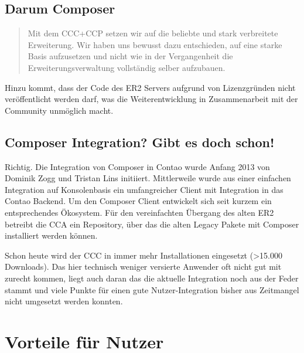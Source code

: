 \documentclass[
paper=a4,
draft=false,%
fontsize=10pt%
]{scrartcl}
\begin{document}
\subsection{Darum Composer}

\begin{quotation}
Mit dem CCC+CCP setzen wir auf die beliebte und stark verbreitete  Erweiterung. Wir haben uns bewusst dazu entschieden, auf eine starke Basis aufzusetzen und nicht wie in der Vergangenheit die Erweiterungsverwaltung vollständig selber aufzubauen.\\
\end{quotation}

Hinzu kommt, dass der Code des ER2 Servers aufgrund von Lizenzgründen nicht veröffentlicht werden darf, was die Weiterentwicklung in Zusammenarbeit mit der Community unmöglich macht. 

\subsection{Composer Integration? Gibt es doch schon!}

Richtig. Die Integration von Composer in Contao wurde Anfang 2013 von Dominik Zogg und Tristan Lins initiiert. Mittlerweile wurde aus einer einfachen Integration auf Konsolenbasis ein umfangreicher Client mit Integration in das Contao Backend. Um den Composer Client entwickelt sich seit kurzem ein entsprechendes Ökosystem. Für den vereinfachten Übergang des alten ER2 betreibt die CCA ein Repository, über das die alten Legacy Pakete mit Composer installiert werden können.

Schon heute wird der CCC in immer mehr Installationen eingesetzt (>15.000 Downloads). Das hier technisch weniger versierte Anwender oft nicht gut mit zurecht kommen, liegt auch daran das die aktuelle Integration noch aus der Feder  stammt und viele Punkte für einen gute Nutzer-Integration bisher aus Zeitmangel nicht umgesetzt werden konnten.

\newpage

%
%

\section{Vorteile für Nutzer}
\end{document}
